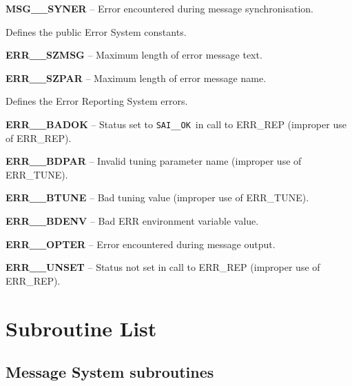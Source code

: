 \documentclass[twoside,11pt]{starlink}
\providecommand{\const}[1]{\texttt{#1}}
\providecommand{\saiok}{\const{SAI\_\_OK}}
\begin{document}
\begin {description}
\begin{description}
\item \textbf{MSG\_\_SYNER} -- Error encountered during message synchronisation.
\end {description}
\item [ERR\_PAR] Defines the public Error System constants.
\begin{description}
\item \textbf{ERR\_\_SZMSG} -- Maximum length of error message text.
\item \textbf{ERR\_\_SZPAR} -- Maximum length of error message name.
\end{description}
\item [ERR\_ERR] Defines the Error Reporting System errors.
\begin{description}
\item \textbf{ERR\_\_BADOK} -- Status set to \saiok\ in call to ERR\_REP
(improper use of ERR\_REP).
\item \textbf{ERR\_\_BDPAR} -- Invalid tuning parameter name
(improper use of ERR\_TUNE).
\item \textbf{ERR\_\_BTUNE} -- Bad tuning value (improper use of ERR\_TUNE).
\item \textbf{ERR\_\_BDENV} -- Bad ERR environment variable value.
\item \textbf{ERR\_\_OPTER} -- Error encountered during message output.
\item \textbf{ERR\_\_UNSET} -- Status not set in call to ERR\_REP (improper use
of ERR\_REP).
\end {description}
\end {description}

\newpage
\section{Subroutine List \label{sublis_sect}}
\subsection{Message System subroutines}
\end{document}

